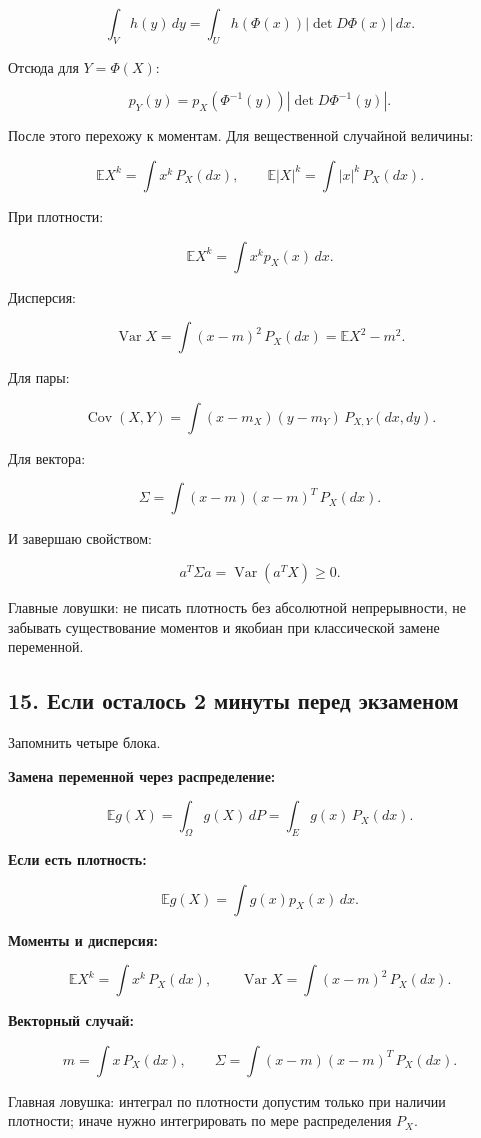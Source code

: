 \documentclass[
  11pt,
  a4paper,
]{article}
\begin{document}
\[
\int_V h(y)\,dy
=
\int_U h(\Phi(x))|\det D\Phi(x)|\,dx.
\]

Отсюда для \(Y=\Phi(X)\):

\[
p_Y(y)=p_X(\Phi^{-1}(y))|\det D\Phi^{-1}(y)|.
\]

После этого перехожу к моментам. Для вещественной случайной величины:

\[
\mathbb EX^k=\int x^k\,P_X(dx),
\qquad
\mathbb E|X|^k=\int |x|^k\,P_X(dx).
\]

При плотности:

\[
\mathbb EX^k=\int x^kp_X(x)\,dx.
\]

Дисперсия:

\[
\operatorname{Var}X
=
\int (x-m)^2\,P_X(dx)
=
\mathbb EX^2-m^2.
\]

Для пары:

\[
\operatorname{Cov}(X,Y)
=
\int (x-m_X)(y-m_Y)\,P_{X,Y}(dx,dy).
\]

Для вектора:

\[
\Sigma
=
\int (x-m)(x-m)^T\,P_X(dx).
\]

И завершаю свойством:

\[
a^T\Sigma a=\operatorname{Var}(a^TX)\ge0.
\]

Главные ловушки: не писать плотность без абсолютной непрерывности, не
забывать существование моментов и якобиан при классической замене
переменной.

\subsection{15. Если осталось 2 минуты перед
экзаменом}\label{ux435ux441ux43bux438-ux43eux441ux442ux430ux43bux43eux441ux44c-2-ux43cux438ux43dux443ux442ux44b-ux43fux435ux440ux435ux434-ux44dux43aux437ux430ux43cux435ux43dux43eux43c}

Запомнить четыре блока.

\textbf{Замена переменной через распределение:}

\[
\mathbb E g(X)
=
\int_\Omega g(X)\,dP
=
\int_E g(x)\,P_X(dx).
\]

\textbf{Если есть плотность:}

\[
\mathbb E g(X)
=
\int g(x)p_X(x)\,dx.
\]

\textbf{Моменты и дисперсия:}

\[
\mathbb EX^k=\int x^k\,P_X(dx),
\qquad
\operatorname{Var}X=\int (x-m)^2\,P_X(dx).
\]

\textbf{Векторный случай:}

\[
m=\int x\,P_X(dx),
\qquad
\Sigma=\int (x-m)(x-m)^T\,P_X(dx).
\]

Главная ловушка: интеграл по плотности допустим только при наличии
плотности; иначе нужно интегрировать по мере распределения \(P_X\).

\newpage
\end{document}
